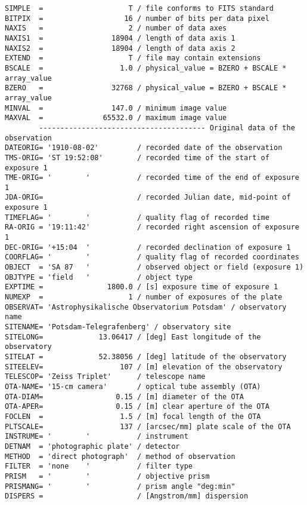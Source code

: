 \documentclass[11pt]{ivoa}
\begin{document}
\begin{lstlisting}
SIMPLE  =                    T / file conforms to FITS standard
BITPIX  =                   16 / number of bits per data pixel
NAXIS   =                    2 / number of data axes
NAXIS1  =                18904 / length of data axis 1
NAXIS2  =                18904 / length of data axis 2
EXTEND  =                    T / file may contain extensions
BSCALE  =                  1.0 / physical_value = BZERO + BSCALE * array_value
BZERO   =                32768 / physical_value = BZERO + BSCALE * array_value
MINVAL  =                147.0 / minimum image value
MAXVAL  =              65532.0 / maximum image value
        --------------------------------------- Original data of the observation
DATEORIG= '1910-08-02'         / recorded date of the observation
TMS-ORIG= 'ST 19:52:08'        / recorded time of the start of exposure 1
TME-ORIG= '        '           / recorded time of the end of exposure 1
JDA-ORIG=                      / recorded Julian date, mid-point of exposure 1
TIMEFLAG= '        '           / quality flag of recorded time
RA-ORIG = '19:11:42'           / recorded right ascension of exposure 1
DEC-ORIG= '+15:04  '           / recorded declination of exposure 1
COORFLAG= '        '           / quality flag of recorded coordinates
OBJECT  = 'SA 87   '           / observed object or field (exposure 1)
OBJTYPE = 'field   '           / object type
EXPTIME =               1800.0 / [s] exposure time of exposure 1
NUMEXP  =                    1 / number of exposures of the plate
OBSERVAT= 'Astrophysikalische Observatorium Potsdam' / observatory name
SITENAME= 'Potsdam-Telegrafenberg' / observatory site
SITELONG=             13.06417 / [deg] East longitude of the observatory
SITELAT =             52.38056 / [deg] latitude of the observatory
SITEELEV=                  107 / [m] elevation of the observatory
TELESCOP= 'Zeiss Triplet'      / telescope name
OTA-NAME= '15-cm camera'       / optical tube assembly (OTA)
OTA-DIAM=                 0.15 / [m] diameter of the OTA
OTA-APER=                 0.15 / [m] clear aperture of the OTA
FOCLEN  =                  1.5 / [m] focal length of the OTA
PLTSCALE=                  137 / [arcsec/mm] plate scale of the OTA
INSTRUME= '        '           / instrument
DETNAM  = 'photographic plate' / detector
METHOD  = 'direct photograph'  / method of observation
FILTER  = 'none    '           / filter type
PRISM   = '        '           / objective prism
PRISMANG= '        '           / prism angle "deg:min"
DISPERS =                      / [Angstrom/mm] dispersion

\end{lstlisting}
\end{document}
